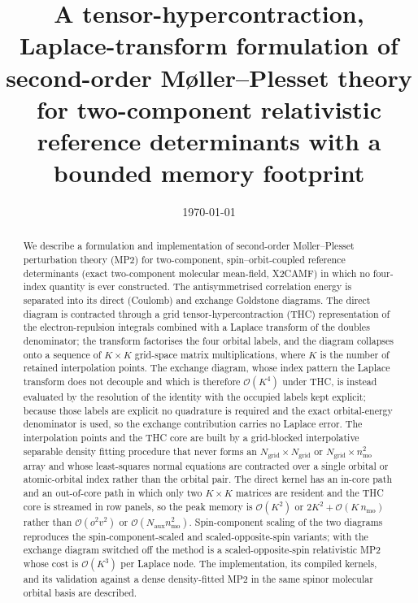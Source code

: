 \documentclass[aip,jcp,amsmath,amssymb,preprint,superscriptaddress]{revtex4-2}%
\newcommand{\affiliation}[1]{}
\newcommand{\Naux}{N_{\mathrm{aux}}}
\newcommand{\Ngrid}{N_{\mathrm{grid}}}
\newcommand{\Ord}[1]{\mathcal{O}\!\left(#1\right)}
\begin{document}
\title{A tensor-hypercontraction, Laplace-transform formulation of
       second-order M{\o}ller--Plesset theory for two-component relativistic
       reference determinants with a bounded memory footprint}

\author{}
\affiliation{Department of Chemistry, Indian Institute of Technology Bombay,
             Powai, Mumbai 400076, India}

\date{\today}

\begin{abstract}
We describe a formulation and implementation of second-order
M{\o}ller--Plesset perturbation theory (MP2) for two-component,
spin--orbit-coupled reference determinants (exact two-component molecular
mean-field, X2CAMF) in which no four-index quantity is ever constructed. The
antisymmetrised correlation energy is separated into its direct (Coulomb) and
exchange Goldstone diagrams. The direct diagram is contracted through a
grid tensor-hypercontraction (THC) representation of the electron-repulsion
integrals combined with a Laplace transform of the doubles denominator; the
transform factorises the four orbital labels, and the diagram collapses onto
a sequence of $K\times K$ grid-space matrix multiplications, where $K$ is the
number of retained interpolation points. The exchange diagram, whose index
pattern the Laplace transform does not decouple and which is therefore
$\Ord{K^4}$ under THC, is instead evaluated by the resolution of the
identity with the occupied labels kept explicit; because those labels are
explicit no quadrature is required and the exact orbital-energy denominator
is used, so the exchange contribution carries no Laplace error. The
interpolation points and the THC core are built by a grid-blocked
interpolative separable density fitting procedure that never forms an
$\Ngrid\times\Ngrid$ or $\Ngrid\times n_{\mathrm{mo}}^2$ array and whose
least-squares normal equations are contracted over a single orbital or
atomic-orbital index rather than the orbital pair. The direct
kernel has an in-core path and an out-of-core path in which only two
$K\times K$ matrices are resident and the THC core is streamed in row
panels, so the peak memory is $\Ord{K^2}$ or $2K^2+\Ord{K\,n_{\mathrm{mo}}}$
rather than $\Ord{o^2v^2}$ or $\Ord{\Naux n_{\mathrm{mo}}^2}$. Spin-component
scaling of the two diagrams reproduces the spin-component-scaled and
scaled-opposite-spin variants; with the exchange diagram switched off the
method is a scaled-opposite-spin relativistic MP2 whose cost is $\Ord{K^3}$
per Laplace node. The implementation, its compiled kernels, and its
validation against a dense density-fitted MP2 in the same spinor molecular
orbital basis are described.
\end{abstract}
\end{document}
